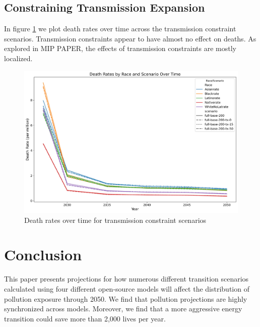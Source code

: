 \documentclass[a4paper]{article}
\theoremstyle{definition}
\theoremstyle{plain}
\begin{document}
\subsection{Constraining Transmission Expansion}
In figure \ref{TransmissionConstraint} we plot death rates over time across the transmission constraint scenarios. Transmission constraints appear to have almost no effect on deaths.  As explored in MIP PAPER, the effects of transmission constraints are mostly localized.
\begin{figure}
    \centering
    \includegraphics[width=1\linewidth]{Figures/Output/Compare_scenarios_transmissions-constraint_GenX.jpg}
    \caption{Death rates over time for transmission constraint scenarios}
    \label{TransmissionConstraint}
\end{figure}

\section{Conclusion}
This paper presents projections for how numerous different transition scenarios calculated using four different open-source models will affect the distribution of pollution exposure through 2050.  We find that pollution projections are highly synchronized across models.  Moreover, we find that a more aggressive energy transition could save more than 2,000 lives per year.

\begin{singlespace}
\newpage

%

\end{singlespace}
\end{document}
